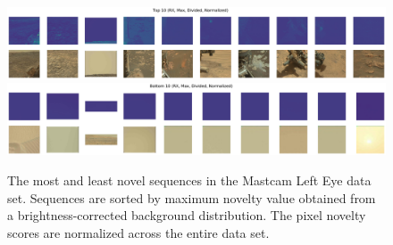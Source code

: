 \begin{figure}
\centering
\includegraphics[width=\linewidth]{figs/msl/top10.jpg}
\includegraphics[width=\linewidth]{figs/msl/bottom10.jpg}
\caption[Examples of the Most and Least Novel Images in the Mastcam Left Eye Data Set]{The most and least novel sequences in the Mastcam Left Eye data set. Sequences are sorted by maximum novelty value obtained from a brightness-corrected background distribution. The pixel novelty scores are normalized across the entire data set.}
\label{msl/fig:sorted}
\end{figure}

